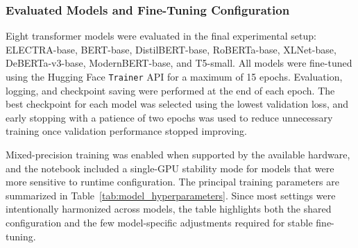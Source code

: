 \documentclass{article}
\begin{document}
\subsubsection{Evaluated Models and Fine-Tuning Configuration}
Eight transformer models were evaluated in the final experimental setup: ELECTRA-base, BERT-base, DistilBERT-base, RoBERTa-base, XLNet-base, DeBERTa-v3-base, ModernBERT-base, and T5-small. All models were fine-tuned using the Hugging Face \texttt{Trainer} API for a maximum of 15 epochs. Evaluation, logging, and checkpoint saving were performed at the end of each epoch. The best checkpoint for each model was selected using the lowest validation loss, and early stopping with a patience of two epochs was used to reduce unnecessary training once validation performance stopped improving.

Mixed-precision training was enabled when supported by the available hardware, and the notebook included a single-GPU stability mode for models that were more sensitive to runtime configuration. The principal training parameters are summarized in Table~\ref{tab:model_hyperparameters}. Since most settings were intentionally harmonized across models, the table highlights both the shared configuration and the few model-specific adjustments required for stable fine-tuning.
\end{document}
